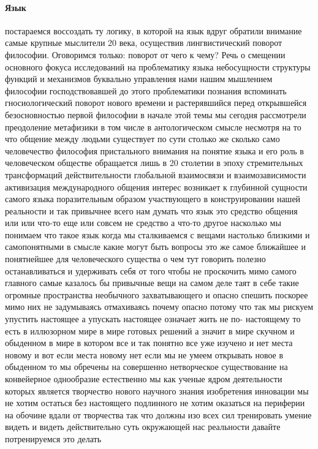 \paragraph{Язык}
постараемся воссоздать ту логику, в которой на язык вдруг обратили внимание самые крупные мыслители 20 века, осуществив лингвистический поворот философии.
Оговоримся только: поворот от чего к чему? Речь о смещении основного фокуса исследований на проблематику языка
небосущности структуры функций и механизмов буквально управления нами нашим
мышлением философии господствовавшей до этого проблематики познания вспоминать
гносиологический поворот нового времени и растерявшийся перед открывшейся
безосновностью первой философии в начале этой темы мы сегодня рассмотрели
преодоление метафизики в том числе в антологическом смысле несмотря на то что
общение между людьми существует по сути столько же сколько само человечество
философия пристального внимания на понятие языка и его роль в человеческом
обществе обращается лишь в 20 столетии в эпоху стремительных трансформаций
действительности глобальной взаимосвязи и взаимозависимости активизация
международного общения интерес возникает к глубинной сущности самого языка
поразительным образом участвующего в конструировании нашей реальности и так
привычнее всего нам думать что язык это средство общения или или что-то еще или
совсем не средство а что-то другое насколько мы понимаем что такое язык когда мы
сталкиваемся с вещами настолько близкими и самопонятными в смысле какие могут
быть вопросы это же самое ближайшее и понятнейшее для человеческого существа о
чем тут говорить полезно останавливаться и удерживать себя от того чтобы не
проскочить мимо самого главного самые казалось бы привычные вещи на самом деле
таят в себе такие огромные пространства необычного захватывающего и опасно
спешить поскорее мимо них не задумываясь отмахиваясь почему опасно потому что
так мы рискуем упустить настоящее а упускать настоящее означает жить не по-
настоящему то есть в иллюзорном мире в мире готовых решений а значит в мире
скучном и обыденном в мире в котором все и так понятно все уже изучено и нет
места новому и вот если места новому нет если мы не умеем открывать новое в
обыденном то мы обречены на совершенно нетворческое существование на конвейерное
однообразие естественно мы как ученые ядром деятельности которых является
творчество нового научного знания изобретения инновации мы не хотим остаться без
настоящего подлинного не хотим оказаться на периферии на обочине вдали от
творчества так что должны изо всех сил тренировать умение видеть и видеть
действительно суть окружающей нас реальности давайте потренируемся это делать
